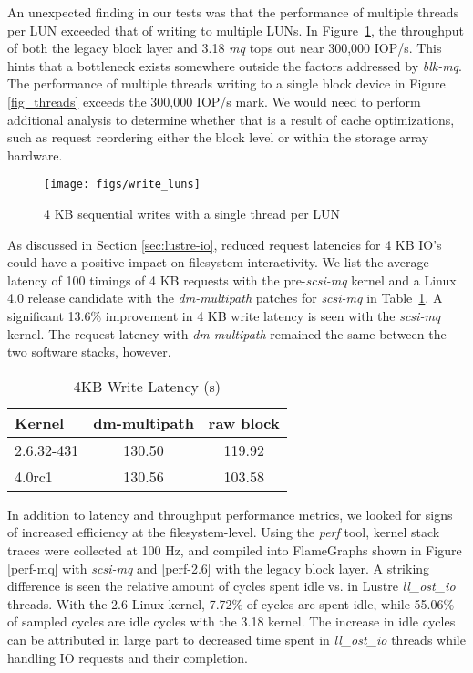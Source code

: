 \documentclass[conference]{IEEEtran}
\begin{document}
An unexpected finding in our tests was that the performance of multiple threads per LUN exceeded that of writing to multiple LUNs. In Figure~\ref{fig_luns},
the throughput of both the legacy block layer and 3.18 \emph{mq} tops out near 300,000 IOP/s. This hints that a bottleneck
exists somewhere outside the factors addressed by \emph{blk-mq}. The performance of multiple threads writing to a single block
device in Figure \ref{fig_threads} exceeds the 300,000 IOP/s mark.  We would need to perform additional analysis to determine
whether that is a result of cache optimizations, such as request reordering either the block level or within
the storage array hardware.


\begin{figure}[!t]
\centering
\texttt{[image: figs/write\_luns]}
\caption{4 KB sequential writes with a single thread per LUN}
\label{fig_luns}
\end{figure}


As discussed in Section \ref{sec:lustre-io}, reduced request latencies for 4 KB IO's could have a positive impact on filesystem
interactivity. We list the average latency of 100 timings of 4 KB requests with the pre-\emph{scsi-mq} kernel and a Linux 4.0 release candidate
with the \emph{dm-multipath} patches for \emph{scsi-mq} in Table~\ref{tab:latency}. A significant 13.6\% improvement in 4 KB write latency is seen
with the \emph{scsi-mq} kernel.  The request latency with \emph{dm-multipath} remained the same between the two software stacks, however.

\begin{table}[!h]
\caption{4KB Write Latency (s)}
\centering
\begin{tabular}{l c c}
\hline\hline
{\bf Kernel} & {\bf dm-multipath} & {\bf raw block} \\
\hline
   2.6.32-431 &   130.50  &   119.92 \\
   4.0rc1 &   130.56  &   103.58 \\
\hline\hline
\end{tabular}
\label{tab:latency}
\end{table}


In addition to latency and throughput performance metrics, we looked for signs of increased efficiency at the filesystem-level. Using the
\emph{perf} tool, kernel stack traces were collected at 100 Hz, and compiled into FlameGraphs \cite{flamegraphs} shown in Figure \ref{perf-mq} 
with \emph{scsi-mq} and \ref{perf-2.6} with the legacy block layer.  A striking difference is seen the relative amount of cycles spent idle vs.
in Lustre \emph{ll\_ost\_io} threads. With the 2.6 Linux kernel, 7.72\% of cycles are spent idle, while 55.06\%
of sampled cycles are idle cycles with the 3.18 kernel. The increase in idle cycles can be attributed in large part to decreased time spent in \emph{ll\_ost\_io}
threads while handling IO requests and their completion.
\end{document}

